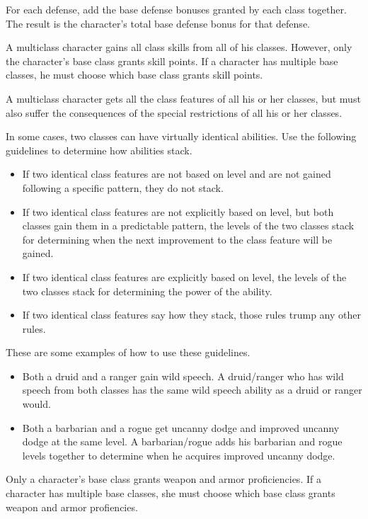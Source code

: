 
For each defense, add the base defense bonuses granted by each class together.
The result is the character's total base defense bonus for that defense.

A multiclass character gains all class skills from all of his classes.
However, only the character's base class grants skill points.
If a character has multiple base classes, he must choose which base class grants skill points.

A multiclass character gets all the class features of all his or her classes, but must also suffer the consequences of the special restrictions of all his or her classes.

\par In some cases, two classes can have virtually identical abilities.
Use the following guidelines to determine how abilities stack.
\begin{itemize}
    \item If two identical class features are not based on level and are not gained following a specific pattern, they do not stack.
    \item If two identical class features are not explicitly based on level, but both classes gain them in a predictable pattern, the levels of the two classes stack for determining when the next improvement to the class feature will be gained.
    \item If two identical class features are explicitly based on level, the levels of the two classes stack for determining the power of the ability.
    \item If two identical class features say how they stack, those rules trump any other rules.
\end{itemize}
These are some examples of how to use these guidelines.
\begin{itemize}
    \item Both a druid and a ranger gain wild speech.
        A druid/ranger who has wild speech from both classes has the same wild speech ability as a druid or ranger would.
    \item Both a barbarian and a rogue get uncanny dodge and improved uncanny dodge at the same level.
        A barbarian/rogue adds his barbarian and rogue levels together to determine when he acquires improved uncanny dodge.
\end{itemize}

Only a character's base class grants weapon and armor proficiencies.
If a character has multiple base classes, she must choose which base class grants weapon and armor profiencies.

